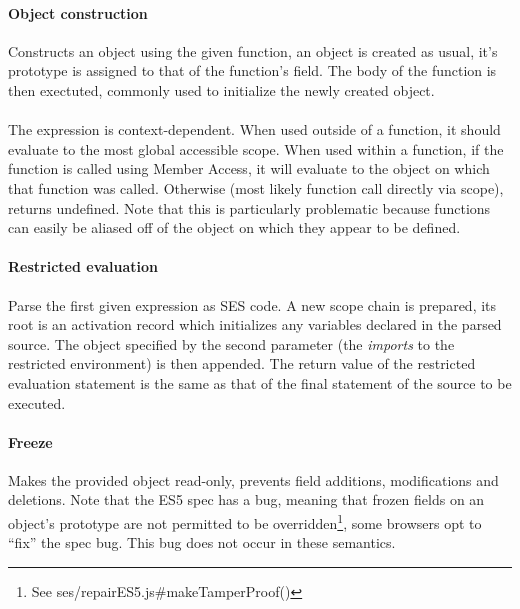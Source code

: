 \documentclass[a4paper]{article}
\begin{document}
\paragraph{Object construction} Constructs an object using the given function, an object
is created as usual, it's prototype is assigned to that of the function's
 field. The body of the function is then exectuted, commonly used
to initialize the newly created object.

\paragraph{} The  expression is context-dependent. When used
outside of a
function, it should evaluate to the most global accessible scope.
When used within a function, if the function is called using Member Access, it
will evaluate to the object on which that function was called. Otherwise
(most likely function call directly via scope),
 returns undefined. Note that this is particularly
problematic because functions can easily be aliased off of the object on which
they appear to be defined.

\paragraph{Restricted evaluation} Parse the first given expression as SES code.
A new scope chain is prepared, its root is an activation record which
initializes any variables declared in the parsed source.
The object specified by the second parameter (the \emph{imports} to the
restricted environment) is then appended.
The return value of the restricted evaluation statement is the same as that of
the final statement of the source to be executed.

\paragraph{Freeze} Makes the provided object read-only, prevents field additions,
modifications and deletions.
Note that the ES5 spec has a bug, meaning that frozen fields on an object's
prototype are not permitted to be overridden\footnote{See
ses/repairES5.js\#makeTamperProof()}, some browsers opt to ``fix'' the spec bug.
This bug does not occur in these semantics.
\end{document}
